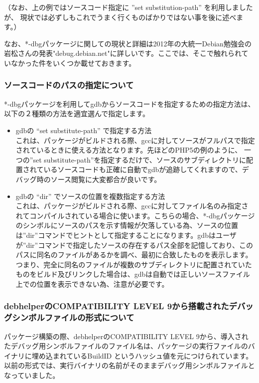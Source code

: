 \documentclass[mingoth,a4paper,twoside]{jsarticle}
\begin{document}
（なお、上の例ではソースコード指定に ''set substitution-path'' を利用しましたが、
現状では必ずしもこれでうまく行くものばかりではない事を後に述べます。）

なお、*-dbgパッケージに関しての現状と詳細は2012年の大統一Debian勉強会の岩松さんの発表"debug.debian.net"\cite{debug-debian-net}に詳しいです。ここでは、そこで触れられていなかった件をいくつか載せておきます。

\subsubsection{ソースコードのパスの指定について}

*-dbgパッケージを利用してgdbからソースコードを指定するための指定方法は、
以下の２種類の方法を適宜選んで指定します。

\begin{itemize}
\item gdbの ``set substitute-path'' で指定する方法\\
  これは、パッケージがビルドされる際、gccに対してソースがフルパスで指定されているときに使える方法となります。先ほどのPHP5の例のように、
  一つの''set substitute-path''を指定するだけで、ソースのサブディレクトリに配置されているソースコードも正確に自動でgdbが追跡してくれますので、デバッグ時のソース閲覧に大変都合が良いです。
\item gdbの ``dir'' でソースの位置を複数指定する方法\\
  これは、パッケージがビルドされる際、gccに対してファイル名のみ指定されてコンパイルされている場合に使います。こちらの場合、*-dbgパッケージのシンボルにソースのパスを示す情報が欠落している為、ソースの位置は''dir''コマンドでヒントとして指定することになります。gdbはユーザが''dir''コマンドで指定したソースの存在するパス全部を記憶しており、このパスに同名のファイルがあるかを調べ、最初に合致したものを表示します。つまり、完全に同名のファイルが複数のサブディレクトリに配置されていたものをビルド及びリンクした場合は、gdbは自動では正しいソースファイル上での位置を表示できない為、注意が必要です。
\end{itemize}

\subsubsection{debhelperのCOMPATIBILITY LEVEL 9から搭載されたデバッグシンボルファイルの形式について}

パッケージ構築の際、debhelperのCOMPATIBILITY LEVEL 9から、導入されたデバッグ用シンボルファイルのファイル名は、パッケージの実行ファイルのバイナリに埋め込まれているBuildID
\cite{build-id-desc}というハッシュ値を元につけられています。以前の形式では、実行バイナリの名前がそのままデバッグ用シンボルファイルとなっていました。
\end{document}

